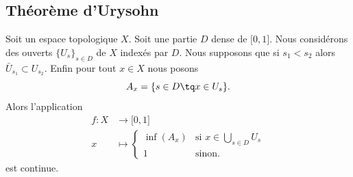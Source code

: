 \subsection{Théorème d'Urysohn}


\begin{lemma}       \label{LEMooWRLRooCdubfZ}
	Soit un espace topologique \( X\). Soit une partie \( D\) dense de \( \mathopen[ 0 , 1 \mathclose]\). Nous considérons des ouverts \( \{ U_s \}_{s\in D} \) de \( X\) indexés par \( D\). Nous supposons que si \( s_1<s_2\) alors \( \bar U_{s_1}\subset U_{s_2}\). Enfin pour tout \( x\in X\) nous posons
	\begin{equation}
		A_x=\{ s\in D\tq x\in U_s \}.
	\end{equation}
	Alors l'application
	\begin{equation}
		\begin{aligned}
			f\colon X & \to \mathopen[ 0 , 1 \mathclose]                       \\
			x         & \mapsto \begin{cases}
				                    \inf(A_x) & \text{si } x\in\bigcup_{s\in D}U_s \\
				                    1         & \text{sinon. }
			                    \end{cases}
		\end{aligned}
	\end{equation}
	est continue.
\end{lemma}

